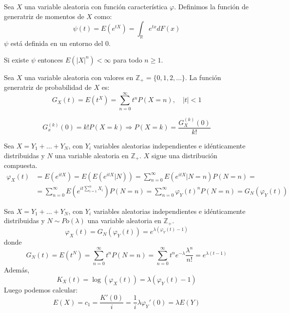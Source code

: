 \begin{definition}
    Sea $X$ una variable aleatoria con función característica $\varphi$.
    Definimos la función de generatriz de momentos de $X$ como:
    $$\psi(t) = E(e^{tX}) = \int_\mathbb{R} e^{tx}dF(x)$$
    $\psi$ está definida en un entorno del 0.
\end{definition}

\begin{remark}
    Si existe $\psi$ entonces $E(|X|^n) < \infty$ para todo $n \geq 1$.
\end{remark}

\begin{definition}
    Sea $X$ una variable aleatoria con valores en $\mathbb{Z}_+ = \{0, 1, 2, \dots\}$.
    La función generatriz de probabilidad de $X$ es:
    $$G_X(t) = E(t^X) = \sum_{n=0}^\infty t^nP(X=n), \quad |t| < 1$$
\end{definition}

\begin{remark}
    $$G_x^{(k)}(0) = k!P(X=k) \Rightarrow P(X=k) = \frac{G_X^{(k)}(0)}{k!}$$
\end{remark}

Sea $X = Y_1 + \dots + Y_N$, con $Y_i$ variables aleatorias independientes e idénticamente distribuidas y $N$ una variable aleatoria en $\mathbb{Z}_+$.
$X$ sigue una distribución compuesta.
\begin{align*}
    \varphi_X(t) & = E(e^{itX}) = E(E(e^{itX}|N)) = \sum_{n=0}^\infty E(e^{itX}|N=n)P(N=n) =                                        \\
                 & = \sum_{n=0}^\infty E(e^{it\sum_{i=1}^n X_i})P(N=n) = \sum_{n=0}^\infty \varphi_Y(t)^nP(N=n) = G_N(\varphi_Y(t))
\end{align*}

\begin{example}
    Sea $X = Y_1 + \dots + Y_N$, con $Y_i$ variables aleatorias independientes e idénticamente distribuidas y $N \sim Po(\lambda)$ una variable aleatoria en $\mathbb{Z}_+$.
    $$\varphi_X(t) = G_N(\varphi_Y(t)) = e^{\lambda(\varphi_Y(t)-1)}$$
    donde
    $$G_N(t) = E(t^N) = \sum_{n=0}^\infty t^nP(N=n) = \sum_{n=0}^\infty t^ne^{-\lambda}\frac{\lambda^n}{n!} = e^{\lambda(t-1)}$$
    Además,
    $$K_X(t) = \log(\varphi_X(t)) = \lambda(\varphi_Y(t) - 1)$$
    Luego podemos calcular:
    $$E(X) = c_1 = \frac{K'(0)}{i} = \frac{1}{i}\lambda \varphi_Y'(0) = \lambda E(Y)$$
\end{example}